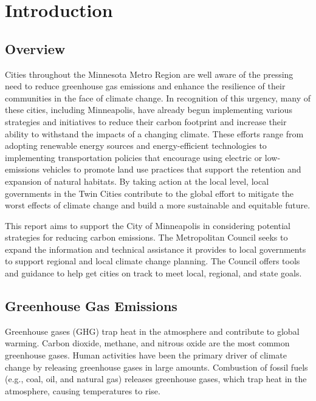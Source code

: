 \documentclass[
]{book}
\begin{document}
\hypertarget{introduction}{%
\chapter{Introduction}\label{introduction}}

\hypertarget{overview}{%
\section{Overview}\label{overview}}

Cities throughout the Minnesota Metro Region are well aware of the pressing need to reduce greenhouse gas emissions and enhance the resilience of their communities in the face of climate change. In recognition of this urgency, many of these cities, including Minneapolis, have already begun implementing various strategies and initiatives to reduce their carbon footprint and increase their ability to withstand the impacts of a changing climate. These efforts range from adopting renewable energy sources and energy-efficient technologies to implementing transportation policies that encourage using electric or low-emissions vehicles to promote land use practices that support the retention and expansion of natural habitats. By taking action at the local level, local governments in the Twin Cities contribute to the global effort to mitigate the worst effects of climate change and build a more sustainable and equitable future.

This report aims to support the City of Minneapolis in considering potential strategies for reducing carbon emissions. The Metropolitan Council seeks to expand the information and technical assistance it provides to local governments to support regional and local climate change planning. The Council offers tools and guidance to help get cities on track to meet local, regional, and state goals.

\hypertarget{greenhouse-gas-emissions}{%
\section{Greenhouse Gas Emissions}\label{greenhouse-gas-emissions}}

Greenhouse gases (GHG) trap heat in the atmosphere and contribute to global warming. Carbon dioxide, methane, and nitrous oxide are the most common greenhouse gases. Human activities have been the primary driver of climate change by releasing greenhouse gases in large amounts. Combustion of fossil fuels (e.g., coal, oil, and natural gas) releases greenhouse gases, which trap heat in the atmosphere, causing temperatures to rise.
\end{document}
